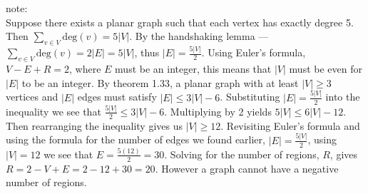 \documentclass{article}
\begin{document}
\newpage
note:\\
Suppose there exists a planar graph such that each vertex has exactly degree 5. Then $\sum_{v\in V}\text{deg}(v)=5|V|$. By the handshaking lemma --- $\sum_{v\in V}\text{deg}(v)=2|E|=5|V|$, thus $|E|=\frac{5|V|}{2}$. Using Euler's formula, $V-E+R=2$, where $E$ must be an integer, this means that $|V|$ must be even for $|E|$ to be an integer. By theorem 1.33, a planar graph with at least $|V|\geq 3$ vertices and $|E|$ edges must satisfy $|E|\leq 3|V|-6$. Substituting $|E|=\frac{5|V|}{2}$ into the inequality we see that $\frac{5|V|}{2}\leq 3|V|-6$. Multiplying by 2 yields $5|V|\leq 6|V|-12$. Then rearranging the inequality gives us $|V|\geq 12$. Revisiting Euler's formula and using the formula for the number of edges we found earlier, $|E|=\frac{5|V|}{2}$, using $|V|=12$ we see that $E=\frac{5(12)}{2}=30$. Solving for the number of regions, $R$, gives $R=2-V+E=2-12+30=20$. However a graph cannot have a negative number of regions.

%
%

\end{document}

